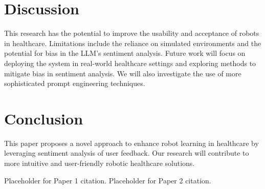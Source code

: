 \documentclass{article}
\begin{document}
\section{Discussion}
This research has the potential to improve the usability and acceptance of robots in healthcare. Limitations include the reliance on simulated environments and the potential for bias in the LLM's sentiment analysis. Future work will focus on deploying the system in real-world healthcare settings and exploring methods to mitigate bias in sentiment analysis. We will also investigate the use of more sophisticated prompt engineering techniques.

\section{Conclusion}
This paper proposes a novel approach to enhance robot learning in healthcare by leveraging sentiment analysis of user feedback. Our research will contribute to more intuitive and user-friendly robotic healthcare solutions.


\begin{thebibliography}{9}
 Placeholder for Paper 1 citation.
 Placeholder for Paper 2 citation.
\end{thebibliography}
\end{document}
